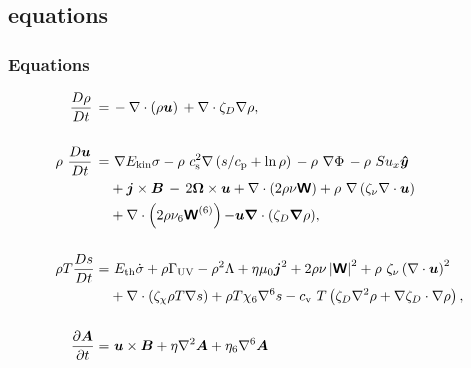 \documentclass{beamer}
\newcommand{\vect}[1]{{{\mbox{\boldmath $#1$}}}}%
\newcommand\ESK{E_{\rm kin}}
\newcommand\EST{E_{\rm th}}
\newcommand\cs{ c_{\rm s}}
\newcommand\cp{ c_{\rm p}}
\newcommand\cv{ c_{\rm v}}
\newcommand\bmt[1]{{\mbox{\boldmath $#1$}}}
\newcommand{\mathbfss}[1]{\textbf{\textsf{#1}}}
\begin{document}
  \subsection{equations}
    \begin{frame}
      \frametitle{Equations}
  \begin{align}
  \label{eq:mass}
  \frac{D\rho}{Dt}\, = &
      \,- \nabla \cdot (\rho \bmt{u})\,
    +\nabla \cdot\zeta_D\nabla\rho,\\[0.5cm]
  \label{eq:mom}
  \rho~\frac{D\bmt{u}}{Dt} \,= &~
    \nabla{\ESK\sigma}
    -\rho~\cs^2\nabla\left({s}/{\cp}+\ln\rho\right)
        \,-\rho~\nabla\Phi
        \,-\rho~Su_x\bm{\hat{y}}
    \\
    &+\vect{j}\times\vect{B}
        \,-\,2\bmt{\Omega}\times\bmt{u}
    +\nabla\cdot \left(2\rho\nu{\mathbfss W}\right)
    +\rho~\nabla\left(\zeta_{\nu}\nabla \cdot \vect{u} \right)
    \nonumber\\
    &+\nabla\cdot \left(2\rho\nu_6{\mathbfss W}^{(6)}\right)
  {-\vect u\vect{\nabla}\cdot\left(\zeta_D\vect{\nabla}\rho\right)},\nonumber\\[0.5cm]
  \label{eq:ent}
    \rho T\frac{D s}{Dt} = &
    ~\EST\dot\sigma +\rho\Gamma_{\rm UV}
    -\rho^2\Lambda +\eta\mu_0\vect{j}^2 
    +2 \rho \nu\left|{\mathbfss W}\right|^{2}
    +\rho~\zeta_{\nu}\left(\nabla \cdot \vect{u} \right)^2
    \\
    &+\nabla\cdot\left(\zeta_\chi\rho T\nabla s\right)
    +\rho T\chi_6\nabla^6 s
    - \cv~T \left(\zeta_D\nabla^2\rho + \nabla\zeta_D\cdot\nabla\rho\right),\nonumber\\[0.5cm]
		    \label{eq:ind}
    \frac{\partial \vect{A}}{\partial t} = &
    ~\vect{u}\times\vect{B}
    +\eta\nabla^2\vect{A}
    +\eta_6\nabla^6\vect{A}
  \end{align}
  \end{frame}
\end{document}

